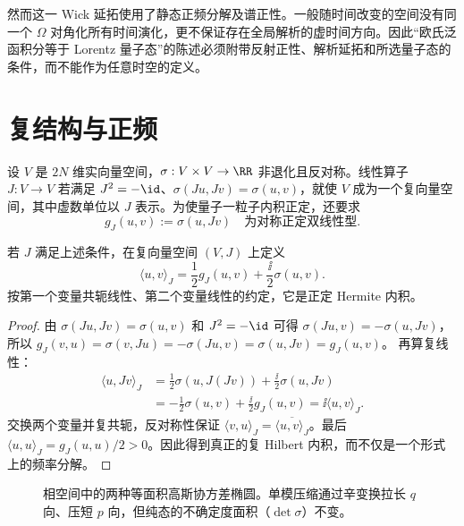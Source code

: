 然而这一 Wick 延拓使用了静态正频分解及谱正性。一般随时间改变的空间没有同一个 $\Omega$ 对角化所有时间演化，更不保证存在全局解析的虚时间方向。因此“欧氏泛函积分等于 Lorentz 量子态”的陈述必须附带反射正性、解析延拓和所选量子态的条件，而不能作为任意时空的定义。


\section{复结构与正频}
\label{sec:ghs-complex-structure-frequency}


设 $V$ 是 $2N$ 维实向量空间，$\sigma:V\times V\to\RR$ 非退化且反对称。线性算子 $J:V\to V$ 若满足 $J^2=-\id$、$\sigma(Ju,Jv)=\sigma(u,v)$，就使 $V$ 成为一个复向量空间，其中虚数单位以 $J$ 表示。为使量子一粒子内积正定，还要求
\begin{equation}\label{eq:ghs-r6-compatible-J}
g_J(u,v):=\sigma(u,Jv)
\quad\text{为对称正定双线性型}.
\end{equation}

\begin{proposition}[从辛结构构造一粒子内积]
若 $J$ 满足上述条件，在复向量空间 $(V,J)$ 上定义
\begin{equation}\label{eq:ghs-r6-oneparticle-inner}
\langle u,v\rangle_J=\frac12g_J(u,v)+\frac{\ii}{2}\sigma(u,v).
\end{equation}
按第一个变量共轭线性、第二个变量线性的约定，它是正定 Hermite 内积。
\end{proposition}
\begin{proof}
由 $\sigma(Ju,Jv)=\sigma(u,v)$ 和 $J^2=-\id$ 可得 $\sigma(Ju,v)=-\sigma(u,Jv)$，所以
$g_J(v,u)=\sigma(v,Ju)=-\sigma(Ju,v)=\sigma(u,Jv)=g_J(u,v)$。
再算复线性：
\begin{align*}
\langle u,Jv\rangle_J
&=\tfrac12\sigma(u,J(Jv))+\tfrac{\ii}{2}\sigma(u,Jv)\\
&=-\tfrac12\sigma(u,v)+\tfrac{\ii}{2}g_J(u,v)
=\ii\langle u,v\rangle_J.
\end{align*}
交换两个变量并复共轭，反对称性保证 $\langle v,u\rangle_J=\overline{\langle u,v\rangle_J}$。最后 $\langle u,u\rangle_J=g_J(u,u)/2>0$。因此得到真正的复 Hilbert 内积，而不仅是一个形式上的频率分解。
\end{proof}


\begin{figure}[htbp]
\centering

\caption{相空间中的两种等面积高斯协方差椭圆。单模压缩通过辛变换拉长 $q$ 向、压短 $p$ 向，但纯态的不确定度面积（$\det\sigma$）不变。}\label{fig:ghs-squeezed-symplectic}
\end{figure}

